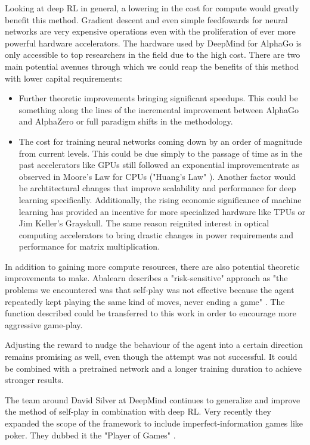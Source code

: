 Looking at deep RL in general, a lowering in the cost for compute would greatly benefit this method. Gradient descent and even simple feedfowards for neural networks are very expensive operations even with the proliferation of ever more powerful hardware accelerators. The hardware used by DeepMind for AlphaGo is only accessible to top researchers in the field due to the high cost. There are two main potential avenues through which we could reap the benefits of this method with lower capital requirements:

\begin{itemize}
    \item Further theoretic improvements bringing significant speedups. This could be something along the lines of the incremental improvement between AlphaGo and AlphaZero or full paradigm shifts in the methodology.
    \item The cost for training neural networks coming down by an order of magnitude from current levels. This could be due simply to the passage of time as in the past accelerators like GPUs still followed an exponential improvementrate as observed in Moore's Law for CPUs \cite{moore_cramming_2006} ("Huang's Law" \cite{noauthor_huangs_2021}). Another factor would be archtitectural changes that improve scalability and performance for deep learning specifically. Additionally, the rising economic significance of machine learning has provided an incentive for more specialized hardware like TPUs \cite{noauthor_tpu_nodate} or Jim Keller's Grayskull. \cite{noauthor_grayskull_nodate} The same reason reignited interest in optical computing accelerators to bring drastic changes in power requirements and performance for matrix multiplication. \cite{noauthor_lightmatter_nodate,noauthor_lightelligence_nodate}
\end{itemize}

In addition to gaining more compute resources, there are also potential theoretic improvements to make. Abalearn describes a "risk-sensitive" approach as "the problems we encountered was that self-play was not effective because the agent repeatedly kept playing the same kind of moves, never ending a game" \cite[p. 8]{campos_abalearn_2003}. The function described could be transferred to this work in order to encourage more aggressive game-play.

Adjusting the reward to nudge the behaviour of the agent into a certain direction remains promising as well, even though the attempt was not successful. It could be combined with a pretrained network and a longer training duration to achieve stronger results.

The team around David Silver at DeepMind continues to generalize and improve the method of self-play in combination with deep RL. Very recently they expanded the scope of the framework to include imperfect-information games like poker. They dubbed it the "Player of Games" \cite{schmid_player_2021}.